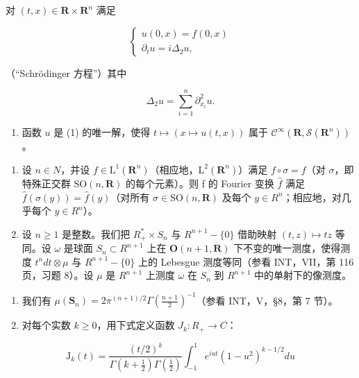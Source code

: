 对 \((t,x)\in\mathbf{R}\times\mathbf{R}^{n}\) 满足

\[
\left\{ \begin{array}{l} u (0, x) = f (0, x) \\ \partial_ {t} u = i \Delta_ {2} u, \end{array} \right.\tag{1}
\]

（“Schrödinger 方程”）其中

\[
\Delta_ {2} u = \sum_ {i = 1} ^ {n} \partial_ {x _ {i}} ^ {2} u.
\]

\begin{enumerate}
\def\labelenumi{\alph{enumi})}
\setcounter{enumi}{1}
\tightlist
\item
  函数 \(u\) 是 (1) 的唯一解，使得 \(t \mapsto (x \mapsto u(t,x))\) 属于 \(\mathcal{C}^{\infty}(\mathbf{R},\mathcal{S}(\mathbf{R}^{n}))\)。
\end{enumerate}

\begin{enumerate}
\def\labelenumi{\arabic{enumi})}
\setcounter{enumi}{18}
\item
  设 \(n \in N\)，并设 \(f \in \mathrm{L}^{1}(\mathbf{R}^{n})\)（相应地，\(\mathrm{L}^{2}(\mathbf{R}^{n})\)）满足 \(f \circ \sigma = f\)（对 \(\sigma\)，即特殊正交群 \(\mathrm{SO}(n, \mathbf{R})\) 的每个元素）。则 f 的 Fourier 变换 \(\widehat{f}\) 满足 \(\widehat{f}(\sigma(y)) = \widehat{f}(y)\)（对所有 \(\sigma \in \mathrm{SO}(n, \mathbf{R})\) 及每个 \(y \in R^{n}\)；相应地，对几乎每个 \(y \in R^{n}\)）。
\item
  设 \(n \geqslant 1\) 是整数。我们把 \(R_{+}^{*} \times S_{n}\) 与 \(R^{n+1} - \{0\}\) 借助映射 \((t, z) \mapsto tz\) 等同。设 \(\omega\) 是球面 \(S_{n} \subset R^{n+1}\) 上在 \(\mathbf{O}(n + 1, \mathbf{R})\) 下不变的唯一测度，使得测度 \(t^{n}dt \otimes \mu\) 与 \(R^{n+1} - \{0\}\) 上的 Lebesgue 测度等同（参看 INT，VII，第 116 页，习题 8）。设 \(\mu\) 是 \(R^{n+1}\) 上测度 \(\omega\) 在 \(S_{n}\) 到 \(R^{n+1}\) 中的单射下的像测度。
\end{enumerate}

\begin{enumerate}
\def\labelenumi{\alph{enumi})}
\item
  我们有 \(\mu (\mathbf{S}_n) = 2\pi^{(n + 1) / 2}\Gamma (\frac{n + 1}{2})^{-1}\)（参看 INT，V，§8，第 7 节）。
\item
  对每个实数 \(k \geqslant 0\)，用下式定义函数 \(J_{k} \colon R_{+} \to C\)：
\end{enumerate}

\[
\mathrm{J} _ {k} (t) = \frac {(t / 2) ^ {k}}{\Gamma (k + \frac {1}{2}) \Gamma (\frac {1}{2})} \int_ {- 1} ^ {1} e ^ {i u t} (1 - u ^ {2}) ^ {k - 1 / 2} d u
\]

